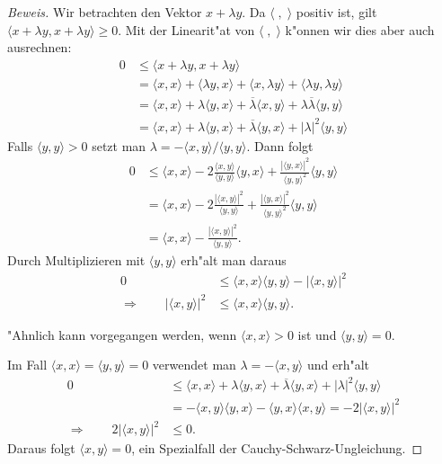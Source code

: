 \begin{proof}[Beweis]
Wir betrachten den Vektor $x+\lambda y$.
Da $\langle\;,\;\rangle$ positiv ist, gilt 
$\langle x+\lambda y,x+\lambda y\rangle \ge 0$.
Mit der Linearit"at von $\langle\;,\;\rangle$ k"onnen wir dies
aber auch ausrechnen:
\begin{align*}
0&\le
\langle x+\lambda y,x+\lambda y\rangle
\\
&=
\langle x,x\rangle
+
\langle \lambda y,x\rangle
+
\langle x,\lambda y\rangle
+
\langle \lambda y,\lambda y\rangle
\\
&=
\langle x,x\rangle
+
\lambda\langle y,x\rangle
+
\overline{\lambda}\langle x,y\rangle
+
\lambda\overline{\lambda}\langle y,y\rangle
\\
&=
\langle x,x\rangle
+
\lambda\langle y,x\rangle
+
\overline{\lambda}\langle y,x\rangle
+
|\lambda|^2\langle y,y\rangle
\end{align*}
Falls $\langle y,y\rangle >0$
setzt man $\lambda = - \langle x,y\rangle/\langle y,y\rangle$.
Dann folgt
\begin{align*}
0
&\le
\langle x,x\rangle
-
2\frac{\langle x,y\rangle}{\langle y,y\rangle}\langle y,x\rangle
+
\frac{|\langle y,x\rangle|^2}{\langle y,y\rangle^2}\langle y,y\rangle
\\
&=
\langle x,x\rangle
-2
\frac{|\langle x,y\rangle|^2}{\langle y,y\rangle}
+
\frac{|\langle y,x\rangle|^2}{\langle y,y\rangle^2}\langle y,y\rangle
\\
&=
\langle x,x\rangle
-
\frac{|\langle x,y\rangle|^2}{\langle y,y\rangle}.
\end{align*}
Durch Multiplizieren mit $\langle y,y\rangle$ erh"alt man daraus
\begin{align*}
0&\le
\langle x,x\rangle\langle y,y\rangle
-
|\langle x,y\rangle|^2
\\
\Rightarrow\qquad
|\langle x,y\rangle|^2
&\le
\langle x,x\rangle\langle y,y\rangle.
\end{align*}

"Ahnlich kann vorgegangen werden, wenn $\langle x,x\rangle > 0$ ist und
$\langle y,y\rangle =0$.

Im Fall $\langle x,x\rangle=\langle y,y\rangle=0$ verwendet man 
$\lambda = -\langle x,y\rangle$ und erh"alt
\begin{align*}
0
&\le
\langle x,x\rangle
+
\lambda\langle y,x\rangle
+
\overline{\lambda}\langle y,x\rangle
+
|\lambda|^2\langle y,y\rangle
\\
&=
-\langle x,y\rangle\langle y,x\rangle
-\langle y,x\rangle\langle x,y\rangle
=
-2|\langle x,y\rangle|^2
\\
\Rightarrow\qquad
2|\langle x,y\rangle|^2
&\le 0.
\end{align*}
Daraus folgt $\langle x,y\rangle = 0$, ein Spezialfall der
Cauchy-Schwarz-Ungleichung.
\end{proof}

